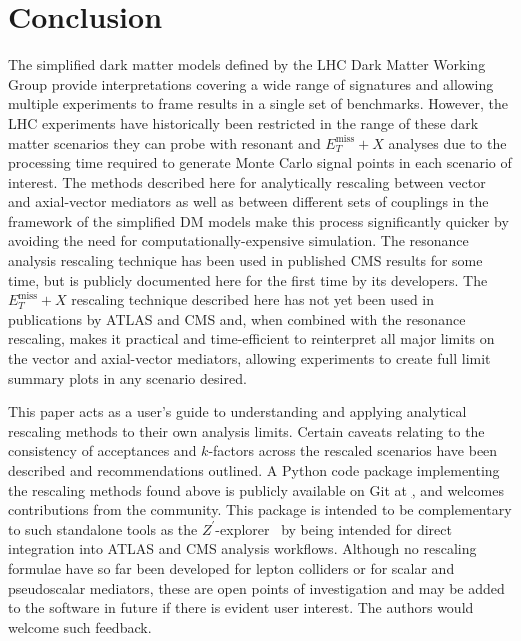 \documentclass[a4paper, 11pt]{article}
\newcommand{\MET}{\ensuremath{E_T^\mathrm{miss}}\xspace}
\newcommand{\metplusx}{\ensuremath{\MET+X}\xspace}
\begin{document}
\section{Conclusion}

The simplified dark matter models defined by the LHC Dark Matter Working Group provide interpretations covering a wide range of signatures and allowing multiple experiments to frame results in a single set of benchmarks.
However, the LHC experiments have historically been restricted in the range of these dark matter scenarios they can probe with resonant and \metplusx analyses due to the processing time required to generate Monte Carlo signal points in each scenario of interest. The methods described here for analytically rescaling between vector and axial-vector mediators as well as between different sets of couplings in the framework of the simplified DM models make this process significantly quicker by avoiding the need for computationally-expensive simulation.  The resonance analysis rescaling technique has been used in published CMS results for some time, but is publicly documented here for the first time by its developers. The \metplusx rescaling technique described here has not yet been used in publications by ATLAS and CMS and, when combined with the resonance rescaling, makes it practical and time-efficient to reinterpret all major limits on the vector and axial-vector mediators, allowing experiments to create full limit summary plots in any scenario desired.

This paper acts as a user's guide to understanding and applying analytical rescaling methods to their own analysis limits. Certain caveats relating to the consistency of acceptances and $k$-factors across the rescaled scenarios have been described and recommendations outlined. A Python code package implementing the rescaling methods found above is publicly available on Git at \href{https://github.com/LHC-DMWG/DMWG-couplingScan-code}, and welcomes contributions from the community. This package is intended to be complementary to such standalone tools as the $Z^\prime$-explorer~\cite{Lozano:2021zbu} by being intended for direct integration into ATLAS and CMS analysis workflows.
Although no rescaling formulae have so far been developed for lepton colliders or for scalar and pseudoscalar mediators, these are open points of investigation and may be added to the software in future if there is evident user interest. The authors would welcome such feedback.
\end{document}
